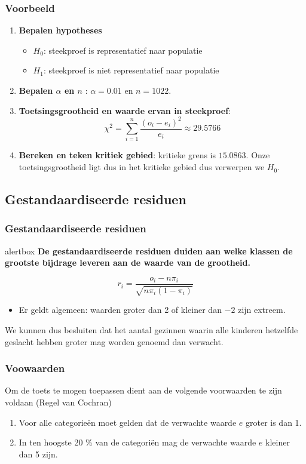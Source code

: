 \documentclass[aspectratio=169]{beamer}
\newcommand{\alertbox}[2][hgblue]{%
  \setbeamercolor{alertbox}{bg=#1,fg=white}
  \begin{beamercolorbox}[sep=2pt,center]{alertbox}
    \textbf{#2}
  \end{beamercolorbox}
}
\begin{document}
\begin{frame}
  \frametitle{Voorbeeld}
  \begin{enumerate}
    \item \textbf{Bepalen hypotheses}
    \begin{itemize}
      \item $H_{0}$: steekproef is representatief naar populatie
      \item $H_{1}$: steekproef is niet representatief naar populatie
    \end{itemize}
    \item \textbf{Bepalen $\alpha$ en $n$} : $\alpha = 0.01$ en $n = 1022$.
    \item \textbf{Toetsingsgrootheid en waarde ervan in steekproef}:
    \[ \chi^{2} = \sum_{i=1}^{n} \frac{(o_{i} - e_{i})^{2}}{e_{i}} \approx 29.5766 \]
    \item \textbf{Bereken en teken kritiek gebied}:  kritieke grens is $15.0863$. Onze toetsingsgrootheid ligt dus in het kritieke gebied dus verwerpen we $H_{0}$.
  \end{enumerate}
\end{frame}

\subsection{Gestandaardiseerde residuen}
\begin{frame}
  \frametitle{Gestandaardiseerde residuen}
  \alertbox{De \textcolor{hgyellow}{gestandaardiseerde residuen} duiden aan welke klassen de grootste bijdrage leveren aan de waarde van de grootheid. }
  \[ r_{i} = \frac{o_{i} - n \pi_{i}}{\sqrt{n \pi_{i}(1-\pi_{i})}} \]
  
  \begin{itemize}
    \item Er geldt algemeen: waarden groter dan 2 of kleiner dan $-2$ zijn extreem.
  \end{itemize}
  We kunnen dus besluiten dat het aantal gezinnen waarin alle kinderen hetzelfde geslacht hebben groter mag worden genoemd dan verwacht.
  
\end{frame}

\begin{frame}
  \frametitle{Voowaarden}
  Om de toets te mogen toepassen dient aan de volgende voorwaarden te zijn voldaan (Regel van Cochran)
  \begin{enumerate}
    \item Voor alle categorie\"en moet gelden dat de verwachte waarde $e$ groter is dan 1.
    \item In ten hoogste 20 \% van de categori\"en mag de verwachte waarde $e$ kleiner dan 5 zijn.
  \end{enumerate}
\end{frame}
\end{document}
